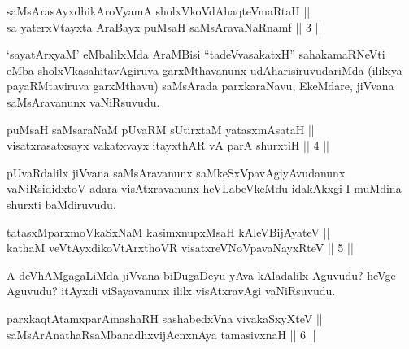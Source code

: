 
\begin{shl}
saMsArasAyxdhikAroV\s yamA sholxVkoVdAhaqteVmaRtaH || \\
sa yaterxVtayxta AraBayx puMsaH saMsAravaNaRnamf \hfill || 3 ||
  
\end{shl}

\begin{artha}
`sayatArxyaM' eMbalilxMda AraMBisi ``tadeVvasakatxH'' saha\break kamaRNeVti
eMba sholxVkasahitavAgiruva garxMthavanunx udAharisiruvudariMda
(ililxya payaRMtaviruva garxMthavu) saMsArada parxkaraNavu,
EkeMdare, jiVvana saMsAravanunx vaNiRsuvudu.
\end{artha}


\begin{shl}
puMsaH saMsaraNaM pUvaRM sUtirxtaM yatasxmAsataH || \\
visatxrasatxsayx vakatxvayx itayxthAR vA parA shurxtiH \hfill || 4 ||
  
\end{shl}

\begin{artha}
pUvaRdalilx jiVvana saMsAravanunx saMkeSxVpavAgiyAvudanunx\break
vaNiRsididxtoV adara visAtxravanunx heVLabeVkeMdu idakAkxgi I muMdina
shurxti baMdiruvudu.
\end{artha}

\begin{shl}
tatasxMparxmoVkaSxNaM kasimxnupxMsaH kAleV\s BijAyateV || \\
kathaM veVtAyxdikoV\s tArxthoVR visatxreVNoVpavaNayxRteV \hfill || 5 ||
  
\end{shl}

\begin{artha}
A deVhAMgagaLiMda jiVvana biDugaDeyu yAva kAladalilx Aguvudu? heVge
Aguvudu? itAyxdi viSayavanunx ililx visAtxravAgi vaNiRsuvudu.
\end{artha}

\begin{shl}
parxkaqtAtamxparAmashaRH sashabedxVna vivakaSxyXteV || \\
saMsArAnathaRsaMbanadhxvijAcnxnAya tamasivxnaH \hfill || 6 ||
  
\end{shl}


